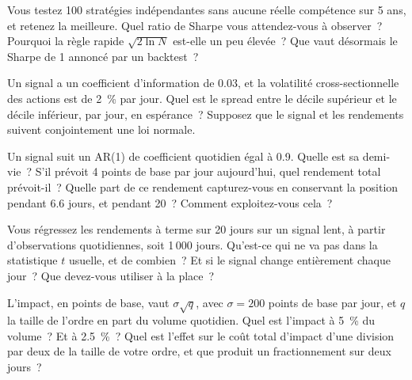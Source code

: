 \begin{question}\label{iq:iv2:research-and-strategy-cases:11}
Vous testez 100 stratégies indépendantes sans aucune réelle compétence sur 5 ans, et retenez la meilleure. Quel ratio de Sharpe vous attendez-vous à observer~? Pourquoi la règle rapide $\sqrt{2\ln N}$ est-elle un peu élevée~? Que vaut désormais le Sharpe de 1 annoncé par un backtest~?
\end{question}

\begin{question}\label{iq:iv2:research-and-strategy-cases:12}
Un signal a un coefficient d'information de 0.03, et la volatilité cross-sectionnelle des actions est de 2~\% par jour. Quel est le spread entre le décile supérieur et le décile inférieur, par jour, en espérance~? Supposez que le signal et les rendements suivent conjointement une loi normale.
\end{question}

\begin{question}\label{iq:iv2:research-and-strategy-cases:13}
Un signal suit un AR(1) de coefficient quotidien égal à 0.9. Quelle est sa demi-vie~? S'il prévoit 4 points de base par jour aujourd'hui, quel rendement total prévoit-il~? Quelle part de ce rendement capturez-vous en conservant la position pendant 6.6 jours, et pendant 20~? Comment exploitez-vous cela~?
\end{question}

\begin{question}\label{iq:iv2:research-and-strategy-cases:14}
Vous régressez les rendements à terme sur 20 jours sur un signal lent, à partir d'observations quotidiennes, soit 1\,000 jours. Qu'est-ce qui ne va pas dans la statistique $t$ usuelle, et de combien~? Et si le signal change entièrement chaque jour~? Que devez-vous utiliser à la place~?
\end{question}

\begin{question}\label{iq:iv2:research-and-strategy-cases:15}
L'impact, en points de base, vaut $\sigma\sqrt{q}$, avec $\sigma = 200$ points de base par jour, et $q$ la taille de l'ordre en part du volume quotidien. Quel est l'impact à 5~\% du volume~? Et à 2.5~\%~? Quel est l'effet sur le coût total d'impact d'une division par deux de la taille de votre ordre, et que produit un fractionnement sur deux jours~?
\end{question}

